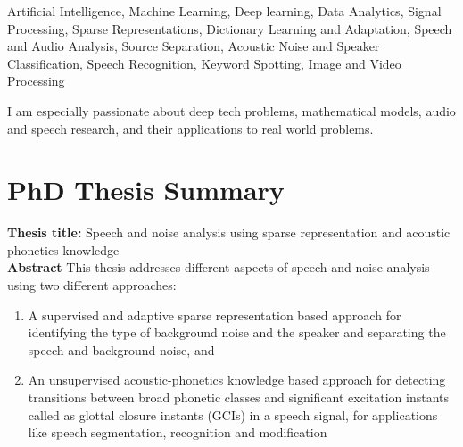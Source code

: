 \documentclass[line]{resume}
\begin{document}
{\begin{resume}
			 Artificial Intelligence, Machine Learning, Deep learning, Data Analytics, Signal Processing,  Sparse Representations, Dictionary Learning and Adaptation, Speech and Audio Analysis, Source Separation, Acoustic Noise and Speaker Classification,  Speech Recognition, Keyword Spotting, Image and Video  Processing
			\vspace{-.1cm}
			
			I am especially passionate about deep tech problems, mathematical models, audio and speech research, and their applications to real world problems.
      	\section{\mysidestyle PhD Thesis Summary}
      	
      	\textbf{Thesis title:} Speech and noise analysis using sparse representation and acoustic phonetics knowledge\\	
			\noindent\textbf{Abstract}  This thesis  addresses  different  aspects of speech and noise analysis using two different approaches:\vspace{-.5cm}
			\begin{enumerate}
				\item  A supervised and adaptive sparse representation based approach for identifying the type of background noise and the speaker and separating the speech and background noise, and
				\item An unsupervised acoustic-phonetics knowledge  based approach for detecting transitions between broad phonetic classes  and significant excitation instants called as glottal closure instants (GCIs) in a speech signal, for applications like speech segmentation, recognition and modification
			\end{enumerate} 
			
			
			
			
			

\end{resume}}
\end{document}
